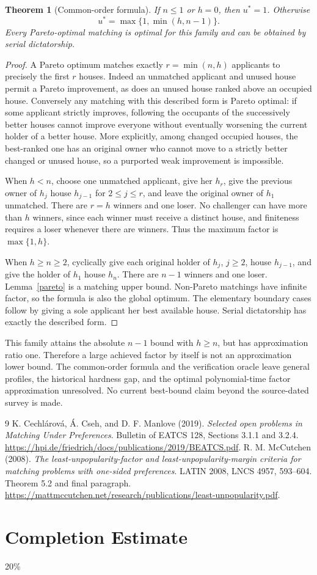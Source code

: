 \documentclass[11pt]{article}
\newtheorem{theorem}{Theorem}
\theoremstyle{remark}
\begin{document}
\begin{theorem}[Common-order formula]\label{common}
If $n\leq1$ or $h=0$, then $u^*=1$. Otherwise
\[
 u^*=\max\{1,\min(h,n-1)\}.
\]
Every Pareto-optimal matching is optimal for this family and can be
obtained by serial dictatorship.
\end{theorem}
\begin{proof}
A Pareto optimum matches exactly $r=\min(n,h)$ applicants to precisely
the first $r$ houses. Indeed an unmatched applicant and unused house
permit a Pareto improvement, as does an unused house ranked above an
occupied house. Conversely any matching with this described form is
Pareto optimal: if some applicant strictly improves, following the
occupants of the successively better houses cannot improve everyone
without eventually worsening the current holder of a better house.
More explicitly, among changed occupied houses, the best-ranked one
has an original owner who cannot move to a strictly better changed or
unused house, so a purported weak improvement is impossible.

When $h<n$, choose one unmatched applicant, give her $h_r$, give the
previous owner of $h_j$ house $h_{j-1}$ for $2\leq j\leq r$, and leave
the original owner of $h_1$ unmatched. There are $r=h$ winners and one
loser. No challenger can have more than $h$ winners, since each winner
must receive a distinct house, and finiteness requires a loser whenever
there are winners. Thus the maximum factor is $\max\{1,h\}$.

When $h\geq n\geq2$, cyclically give each original holder of $h_j$,
$j\geq2$, house $h_{j-1}$, and give the holder of $h_1$ house $h_n$.
There are $n-1$ winners and one loser. Lemma~\ref{pareto} is a matching
upper bound. Non-Pareto matchings have infinite factor, so the formula
is also the global optimum. The elementary boundary cases follow by
giving a sole applicant her best available house. Serial dictatorship
has exactly the described form.
\end{proof}

This family attains the absolute $n-1$ bound with $h\geq n$, but has
approximation ratio one. Therefore a large achieved factor by itself
is not an approximation lower bound. The common-order formula and the
verification oracle leave general profiles, the historical hardness
gap, and the optimal polynomial-time factor approximation unresolved.
No current best-bound claim beyond the source-dated survey is made.
\begin{thebibliography}{9}
 K. Cechl\'arov\'a, \'A. Cseh, and D. F. Manlove (2019).
\emph{Selected open problems in Matching Under Preferences}.
Bulletin of EATCS 128, Sections 3.1.1 and 3.2.4.
\url{https://hpi.de/friedrich/docs/publications/2019/BEATCS.pdf}.
 R. M. McCutchen (2008).
\emph{The least-unpopularity-factor and least-unpopularity-margin
criteria for matching problems with one-sided preferences}.
LATIN 2008, LNCS 4957, 593--604. Theorem 5.2 and final paragraph.
\url{https://mattmccutchen.net/research/publications/least-unpopularity.pdf}.
\end{thebibliography}
\section{Completion Estimate}
20\%
\end{document}
